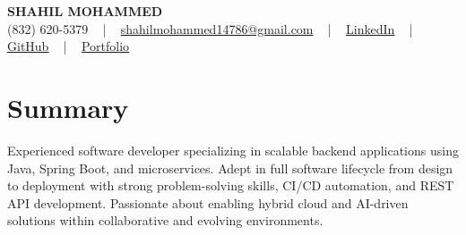 \documentclass[letterpaper,10pt]{article}
\begin{document}
\begin{center}
    {\fontsize{14pt}{12pt}\selectfont \textbf{\MakeUppercase{Shahil Mohammed}}}\\ \vspace{2pt}
    \fontsize{10pt}{12pt}\selectfont (832) 620-5379 ~ | ~ \href{mailto:shahilmohammed14786@gmail.com}{shahilmohammed14786@gmail.com} ~ | ~  
    \href{https://www.linkedin.com/in/shahil-mohammed-9652931a1/}{\color{blue}\underline{LinkedIn}}  ~ | ~ 
    \href{https://github.com/freakbeast14}{\color{blue}\underline{GitHub}} ~ | ~ 
    \href{https://shahil-mohammed.netlify.app/}{\color{blue}\underline{Portfolio}}
    \vspace{-8pt}
\end{center}

\section{Summary}
\vspace{-2pt}\fontsize{8pt}{9pt}\selectfont
Experienced software developer specializing in scalable backend applications using Java, Spring Boot, and microservices. Adept in full software lifecycle from design to deployment with strong problem-solving skills, CI/CD automation, and REST API development. Passionate about enabling hybrid cloud and AI-driven solutions within collaborative and evolving environments.  
 \vspace{-5pt}
 
\vspace{-2pt}
\end{document}
